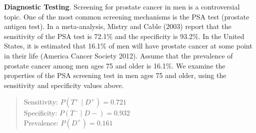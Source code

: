 \documentclass{article}
\begin{document}
\textbf{Diagnostic Testing}. Screening for prostate cancer in men is a controversial topic.  One of the most common screening mechanisms is the PSA test (prostate antigen test).  In a meta-analysis, Mistry and Cable (2003) report that the sensitivity of the PSA test is 72.1\% and the specificity is 93.2\%. In the United States, it is estimated that 16.1\% of men will have prostate cancer at some point in their life (America Cancer Society 2012).   Assume that the prevalence of prostate cancer among men ages 75 and older is 16.1\%. We examine the properties of the PSA screening test in men ages 75 and older, 
using the sensitivity and specificity values above.\\ 

\begin{quote}Sensitivity: \(P(T^+ \mid D^+) =0.721 \)\\
Specificity: \(P(T^- \mid D-) = 0.932\)\\
Prevalence: \(P(D^+)=0.161\)
\end{quote}
\end{document}
